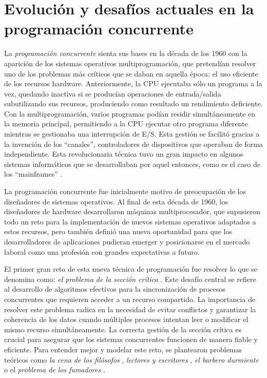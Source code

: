 \chapter{\textbf{Evolución y desafíos actuales en la programación concurrente}}
La \textit{programación concurrente} sienta sus bases en la década de los 1960 con la aparición de los sistemas operativos multiprogramación, que pretendían resolver uno de los problemas más críticos que se daban en aquella época: el uso eficiente de los recursos hardware. Anteriormente, la CPU ejecutaba sólo un programa a la vez, quedando inactiva si se producían operaciones de entrada/salida subutilizando sus recursos, produciendo como resultado un rendimiento deficiente. Con la multiprogramación, varios programas podían residir simultáneamente en la memoria principal, permitiendo a la CPU ejecutar otro programa diferente mientras se gestionaba una interrupción de E/S. Esta gestión se facilitó gracias a la invención de los ``canales'', controladores de dispositivos que operaban de forma independiente. Esta revolucionaria técnica tuvo un gran impacto en algunos sistemas informáticos que se desarrollaban por aquel entonces, como es el caso de los ``mainframes'' \cite{TecnologiaInformaticaMainframe}.


La programación concurrente fue inicialmente motivo de preocupación de los diseñadores de sistemas operativos. Al final de esta década de 1960, los diseñadores de hardware desarrollaron máquinas multiprocesador, que supusieron todo un reto para la implementación de nuevos sistemas operativos adaptados a estos recursos, pero también definió una nueva oportunidad para que los desarrolladores de aplicaciones pudieran emerger y posicionarse en el mercado laboral como una profesión con grandes expectativas a futuro.



El primer gran reto de esta nueva técnica de programación fue resolver lo que se denomina como: \textit{el problema de la sección crítica} \cite{kakugawacriticalsection}. Este desafío central se refiere al desarrollo de algoritmos efectivos para la sincronización de procesos concurrentes que requieren acceder a un recurso compartido. La importancia de resolver este problema radica en la necesidad de evitar conflictos y garantizar la coherencia de los datos cuando múltiples procesos intentan leer o modificar el mismo recurso simultáneamente. La correcta gestión de la sección crítica es crucial para asegurar que los sistemas concurrentes funcionen de manera fiable y eficiente. Para entender mejor y modelar este reto, se plantearon problemas teóricos como \textit{la cena de los filósofos} \cite{brosgol1996dining}, \textit{lectores y escritores} \cite{nithyasrikannathalreaders}, \textit{el barbero durmiente} \cite{SariSleepingBarber} o el \textit{problema de los fumadores} \cite{MTUSmokerProblem}.


